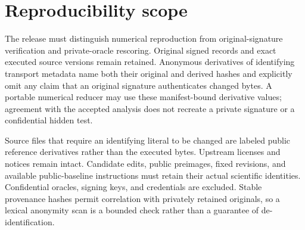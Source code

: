 \section{Reproducibility scope}
\label{sec:reproduction-scope}

The release must distinguish numerical reproduction from original-signature
verification and private-oracle rescoring. Original signed records and exact
executed source versions remain retained. Anonymous derivatives of identifying
transport metadata name both their original and derived hashes and explicitly
omit any claim that an original signature authenticates changed bytes. A
portable numerical reducer may use these manifest-bound derivative values;
agreement with the accepted analysis does not recreate a private signature or
a confidential hidden test.

Source files that require an identifying literal to be changed are labeled
public reference derivatives rather than the executed bytes. Upstream licenses
and notices remain intact. Candidate edits, public preimages, fixed revisions,
and available public-baseline instructions must retain their actual scientific
identities. Confidential oracles, signing keys, and credentials are excluded.
Stable provenance hashes permit correlation with privately retained originals,
so a lexical anonymity scan is a bounded check rather than a guarantee of
de-identification.
